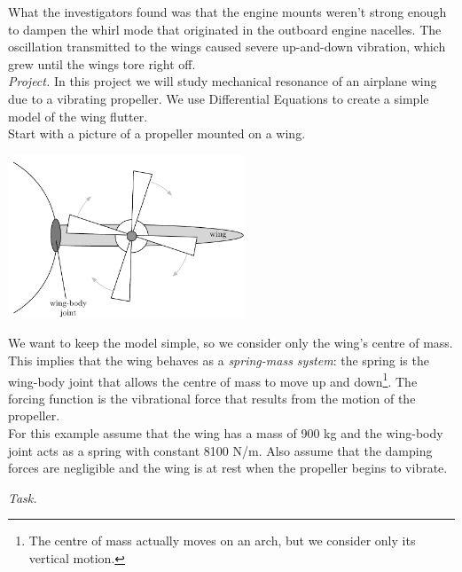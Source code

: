 What the investigators found was that the engine mounts weren't strong enough to dampen the whirl mode that originated in the outboard engine nacelles. The oscillation transmitted to the wings caused severe up-and-down vibration, which grew until the wings tore right off. \hfill \\




\emph{Project. } In this project we will study mechanical resonance of an airplane wing due to a vibrating propeller.
We use Differential Equations to create a simple model of the wing flutter. \\

Start with a picture of a propeller mounted on a wing.

\begin{center}
\includegraphics*[width=200pt]{images/project-wing-wing.pdf}
\end{center}

We want to keep the model simple, so we consider only the wing's centre of mass. This implies that the wing behaves as a \emph{spring-mass system}: the spring is the wing-body joint that allows the centre of mass to move up and down\footnote{The centre of mass actually moves on an arch, but we consider only its vertical motion.}. The forcing function is the vibrational force that results from the motion of the propeller. \\

For this example assume that the wing has a mass of 900 kg and the wing-body joint acts as a spring with constant 8100 N/m. Also assume that the damping forces are negligible and the wing is at rest when the propeller begins to vibrate.

\emph{Task. } 

